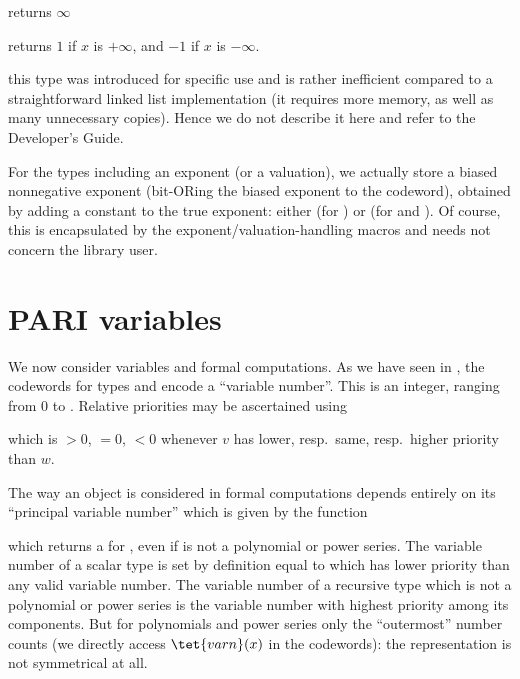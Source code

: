  returns $\infty$

 returns $1$ if $x$ is $+\infty$, and $-1$
if $x$ is $-\infty$.

this type was introduced for specific  use and is rather inefficient
compared to a straightforward linked list implementation (it requires more
memory, as well as many unnecessary copies). Hence we do not describe it
here and refer to the Developer's Guide.

 For the types including an exponent (or a
valuation), we actually store a biased nonnegative exponent (bit-ORing the
biased exponent to the codeword), obtained by adding a constant to the true
exponent: either  (for ) or  (for
 and ). Of course, this is encapsulated by the
exponent/valuation-handling macros and needs not concern the library user.

\section{PARI variables}\label{se:vars}

\noindent We now consider variables and formal computations. As we have seen
in , the codewords for types  and  encode a
``variable number''. This is an integer, ranging from $0$ to .
Relative priorities may be ascertained using


\noindent which is $>0$, $=0$, $<0$ whenever $v$ has lower, resp.~same,
resp.~higher priority than $w$.

The way an object is considered in formal computations depends entirely on
its ``principal variable number'' which is given by the function


\noindent which returns a  for , even if 
is not a polynomial or power series. The variable number of a scalar type is
set by definition equal to  which has lower priority than any
valid variable number. The variable number of a recursive type which is not a
polynomial or power series is the variable number with highest priority among
its components. But for polynomials and power series only the ``outermost''
number counts (we directly access $\tet{varn}(x)$ in the codewords): the
representation is not symmetrical at all.

